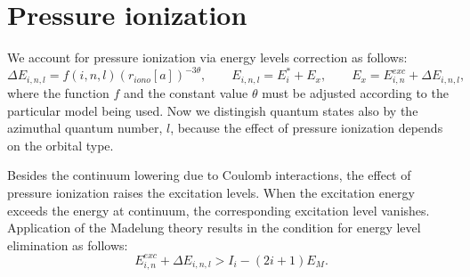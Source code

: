 \section{Pressure ionization}
We account for pressure ionization via energy levels correction as follows:
\begin{equation}
\Delta E_{i,n,l} = f(i,n,l) (r_{iono}[a])^{-3 \theta}, \qquad
E_{i,n,l} = E^*_i + E_x, \qquad
E_x = E^{exc}_{i,n} + \Delta E_{i,n,l},
\end{equation}
where the function $f$ and the constant value $\theta$ must be adjusted
according to the particular model being used. Now we distingish quantum states also by
the azimuthal quantum number, $l$, because the effect of pressure ionization
depends on the orbital type.

Besides the continuum lowering due to Coulomb interactions, the effect of
pressure ionization raises the excitation levels. When the excitation energy
exceeds the energy at continuum, the corresponding excitation level vanishes.
Application of the Madelung theory results in the condition for
energy level elimination as follows:
\begin{equation}
E^{exc}_{i,n} + \Delta E_{i,n,l} > I_i - (2i+1) E_M.
\end{equation}

